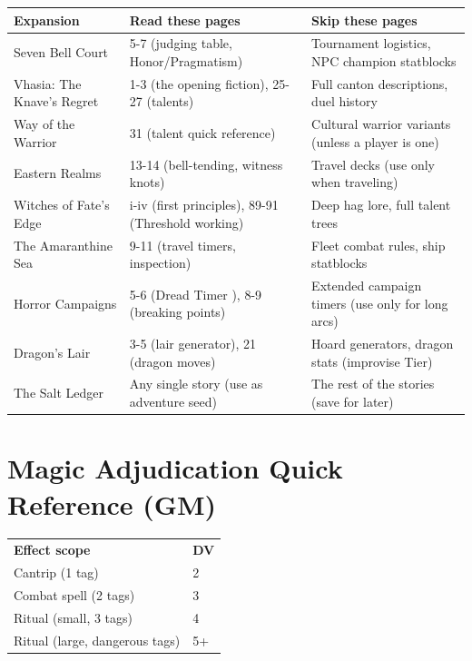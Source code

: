 \begin{longtable}{p{4cm}|p{4cm}|p{4cm}}
\hline
\textbf{Expansion} & \textbf{Read these pages} & \textbf{Skip these pages} \\
\hline
Seven Bell Court & 5-7 (judging table, Honor/Pragmatism) & Tournament logistics, NPC champion statblocks \\
\hline
Vhasia: The Knave's Regret & 1-3 (the opening fiction), 25-27 (talents) & Full canton descriptions, duel history \\
\hline
Way of the Warrior & 31 (talent quick reference) & Cultural warrior variants (unless a player is one) \\
\hline
Eastern Realms & 13-14 (bell-tending, witness knots) & Travel decks (use only when traveling) \\
\hline
Witches of Fate's Edge & i-iv (first principles), 89-91 (Threshold working) & Deep hag lore, full talent trees \\
\hline
The Amaranthine Sea & 9-11 (travel timers, inspection) & Fleet combat rules, ship statblocks \\
\hline
Horror Campaigns & 5-6 (Dread Timer ), 8-9 (breaking points) & Extended campaign timers (use only for long arcs) \\
\hline
Dragon's Lair & 3-5 (lair generator), 21 (dragon moves) & Hoard generators, dragon stats (improvise Tier) \\
\hline
The Salt Ledger & Any single story (use as adventure seed) & The rest of the stories (save for later) \\
\hline
\end{longtable}

\section*{Magic Adjudication Quick Reference (GM)}
\label{sec:gm-magic-cheat}

\begin{tcolorbox}[colback=red!5!white,colframe=red!75!black,title=Default Magic DV,breakable]
\centering
\begin{tabular}{ll}
\textbf{Effect scope} & \textbf{DV} \\
Cantrip (1 tag) & 2 \\
Combat spell (2 tags) & 3 \\
Ritual (small, 3 tags) & 4 \\
Ritual (large, dangerous tags) & 5+ \\
\end{tabular}
\end{tcolorbox}

